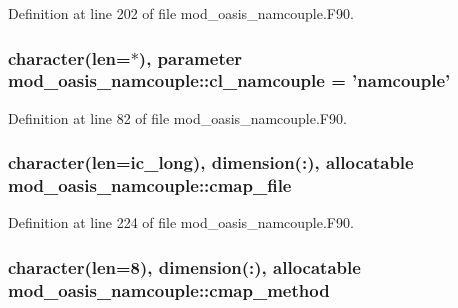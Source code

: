 Definition at line 202 of file mod\+\_\+oasis\+\_\+namcouple.\+F90.

\hypertarget{classmod__oasis__namcouple_ae023a43e29bb32ebf11f193e34d8bd85}{
\subsubsection[{cl\+\_\+namcouple}]{\setlength{\rightskip}{0pt plus 5cm}character(len=$\ast$), parameter mod\+\_\+oasis\+\_\+namcouple\+::cl\+\_\+namcouple = 'namcouple'\hspace{0.3cm}{\ttfamily [private]}}}\label{classmod__oasis__namcouple_ae023a43e29bb32ebf11f193e34d8bd85}


Definition at line 82 of file mod\+\_\+oasis\+\_\+namcouple.\+F90.

\hypertarget{classmod__oasis__namcouple_a6dbd7bccbfa28b209a4bc58131f8cf11}{
\subsubsection[{cmap\+\_\+file}]{\setlength{\rightskip}{0pt plus 5cm}character(len=ic\+\_\+long), dimension(\+:), allocatable mod\+\_\+oasis\+\_\+namcouple\+::cmap\+\_\+file\hspace{0.3cm}{\ttfamily [private]}}}\label{classmod__oasis__namcouple_a6dbd7bccbfa28b209a4bc58131f8cf11}


Definition at line 224 of file mod\+\_\+oasis\+\_\+namcouple.\+F90.

\hypertarget{classmod__oasis__namcouple_ac8c1f0014f2c3cbe0cc4fcb09e54dde3}{
\subsubsection[{cmap\+\_\+method}]{\setlength{\rightskip}{0pt plus 5cm}character(len=8), dimension(\+:), allocatable mod\+\_\+oasis\+\_\+namcouple\+::cmap\+\_\+method\hspace{0.3cm}{\ttfamily [private]}}}\label{classmod__oasis__namcouple_ac8c1f0014f2c3cbe0cc4fcb09e54dde3}


